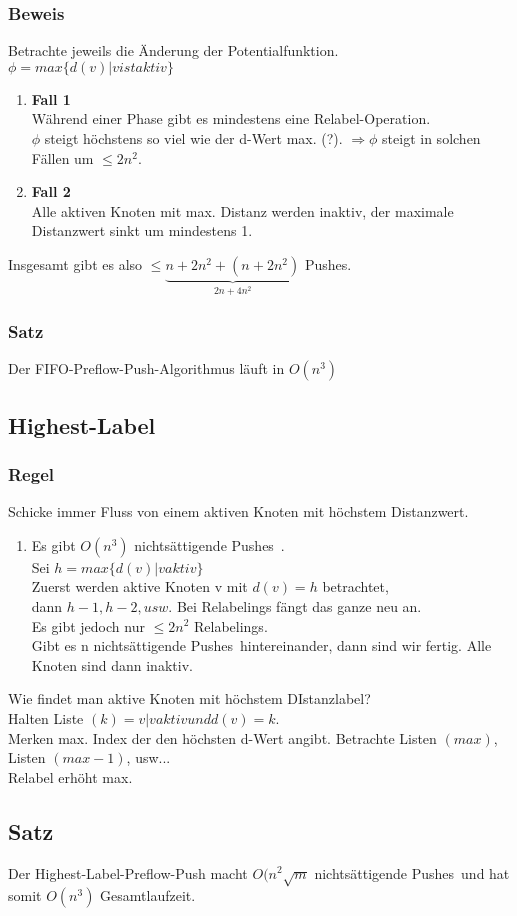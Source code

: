 \documentclass[11pt]{article}
\newcommand{\pns}{nichts\"attigende Pushes\ }
\begin{document}
\subsubsection{Beweis}
Betrachte jeweils die \"Anderung der Potentialfunktion.\\
$\phi = max\{d(v)|v ist aktiv\}$
\begin{enumerate}
    \item \textbf{Fall 1} \\
        W\"ahrend einer Phase gibt es mindestens eine Relabel-Operation.\\
        $\phi$ steigt h\"ochstens so viel wie der d-Wert max. (?).
        $\Rightarrow \phi$ steigt in solchen F\"allen um $\leq 2n^2$.
    \item \textbf{Fall 2} \\
        Alle aktiven Knoten mit max. Distanz werden inaktiv, der maximale Distanzwert sinkt um mindestens 1.
\end{enumerate}
Insgesamt gibt es also $\leq \underbrace{n+2n^2 + (n+2n^2)}_{2n+4n^2}$ Pushes.
\subsubsection{Satz}
Der FIFO-Preflow-Push-Algorithmus l\"auft in $O(n^3)$

\subsection{Highest-Label}
\subsubsection{Regel}
Schicke immer Fluss von einem aktiven Knoten mit h\"ochstem Distanzwert.
\begin{enumerate}
    \item Es gibt $O(n^3)$ \pns.\\
        Sei $h = max\{d(v)|v aktiv\}$\\
        Zuerst werden aktive Knoten v mit $d(v)=h$ betrachtet, \\
        dann $h-1, h-2, usw.$
        Bei Relabelings f\"angt das ganze neu an.\\
        Es gibt jedoch nur $\leq 2n^2$ Relabelings.\\
        Gibt es n \pns hintereinander, dann sind wir fertig. Alle Knoten sind dann inaktiv.
\end{enumerate}
Wie findet man aktive Knoten mit h\"ochstem DIstanzlabel? \\
Halten Liste $(k) = {v | v aktiv und d(v)=k}$.\\
Merken max. Index der den h\"ochsten d-Wert angibt. Betrachte Listen $(max)$, Listen $(max-1)$, usw...\\
Relabel erh\"oht max.
\subsection{Satz}
Der Highest-Label-Preflow-Push macht $O(n^2\sqrt{m}$ \pns und hat somit $O(n^3)$ Gesamtlaufzeit.
\end{document}
